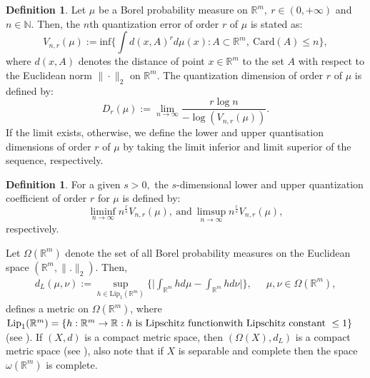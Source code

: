 \documentclass{amsproc}
\theoremstyle{definition}
\newtheorem{definition}[theorem]{Definition}
\theoremstyle{remark}
\numberwithin{equation}{section}
\newcommand{\set}[1]{\{#1\}}%
\newcommand{\C}[1]{\mathcal{#1}}%
\newcommand{\D}[1]{\mathbb{#1}}%
\newcommand{\te}{\text}%
\begin{document}
\begin{definition}\cite{GL1}
    Let $\mu$ be a Borel probability measure on $\mathbb{R}^m,~r \in (0, +\infty)$ and $n \in \mathbb{N}.$  Then, the $n$th quantization error of order $r$ of $\mu$ is stated as:
    \[V_{n, r}(\mu):=\text{inf} \Big\{\int d(x, A)^r d\mu(x): A \subset \mathbb{R}^m, \ \text{Card}(A) \leq n\Big\},\]
    where $d(x,A)$ denotes the distance of point $x \in \mathbb{R}^m$ to the set $A$ with respect to the Euclidean norm $\|\cdot\|_2$ on $\mathbb{R}^m.$
    The quantization dimension of order $r$ of $\mu$ is defined by:
    $$ D_r(\mu):= \lim_{n\to \infty} \frac{r \log n}{- \log(V_{n,r}(\mu))}.$$
    If the limit exists, otherwise, we define the lower and upper quantisation dimensions of order $r$ of $\mu$ by taking the limit inferior and limit superior of the sequence, respectively.
\end{definition}
\begin{definition}\cite{GL1}
    For a given $s>0,$ the $s$-dimensional lower and upper quantization coefficient of order $r$ for $\mu$ is defined by:
    $$\liminf_{n \to \infty} n^{\frac{r}{s}}V_{n,r}(\mu),~ \text{and}~ \limsup_{n \to \infty}  n^{\frac{r}{s}}V_{n,r}(\mu),$$
    respectively.
\end{definition}
Let $\Omega(\mathbb{R}^m)$ denote the set of all Borel probability measures on the Euclidean space $(\mathbb{R}^m,\|.\|_2)$. Then,
\begin{equation*}
\begin{aligned}
d_L (\mathfrak{\mu}, \mathfrak{\nu}) :=\sup_{h\in\te{Lip}_1(\mathbb{R}^m)} \Big\{\Big|\int_{\mathbb{R}^m} h d\mu -\int_{\mathbb{R}^m} hd\mathfrak{\nu}\Big|\Big\}, \ \ \quad \mu, \mathfrak{\nu} \in \Omega(\mathbb{R}^m) , \end{aligned}
\end{equation*}
defines a metric on $\Omega(\mathbb{R}^m)$, where $\te{Lip}_1(\mathbb{R}^m)=\{h:\mathbb{R}^m\rightarrow \mathbb{R}: h\te{ is Lipschitz function}\\ \te{with Lipschitz constant }\le1\}$ (see \cite{Mat,Parth}). If $(X,d)$ is a compact metric space, then
$(\Omega(X), d_L)$ is a compact metric space (see \cite[Theorem~5.1]{B}), also note that if $X$ is separable and complete then the space $\omega(\mathbb{R}^m)$ is complete.
\par
\end{document}
